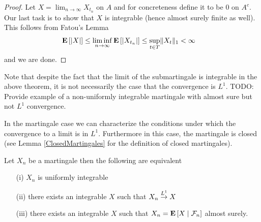 \begin{proof}
Let $X = \lim_{n \to \infty} X_{t_n}$  on $A$ and for concreteness
define it to be $0$ on $A^c$.  Our last task is to show that
$X$ is integrable (hence almost surely finite as well).  This follows
from Fatou's Lemma
\begin{align*}
\expectation{\abs{X}} &\leq \liminf_{n \to \infty}
\expectation{\abs{X_{t_n} }} \leq \sup_{t \in T} \norm{X_t}_1 < \infty
\end{align*}
and we are done.
\end{proof} 
Note that despite the fact that the limit of the submartingale is
integrable in the above theorem, it is not necessarily the case that the
convergence is $L^1$.
TODO: Provide example of a non-uniformly integrable martingale with
almost sure but not $L^1$ convergence.

In the martingale case we can characterize the conditions under which
the convergence to a limit is in $L^1$.  Furthermore in this case, the
martingale is closed (see Lemma \ref{ClosedMartingales} for the
definition of closed martingales).
\begin{thm}\label{L1MartingaleConvergenceTheoremDiscrete}Let $X_n$ be a martingale then the following are equivalent
\begin{itemize}
\item[(i)]$X_n$ is uniformly
  integrable
\item[(ii)]there exists an integrable $X$  such that
  $X_n \tolp{1} X$
\item[(iii)]there exists an integrable $X$ such that
  $X_n = \cexpectationlong{\mathcal{F}_n}{X}$ almost surely.
\end{itemize}
\end{thm}
